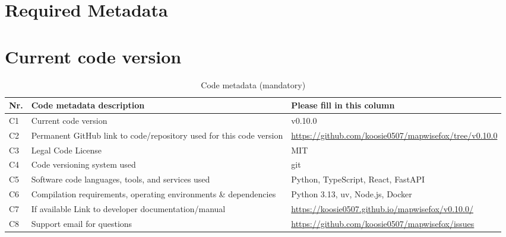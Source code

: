 \documentclass[preprint,12pt, a4paper]{elsarticle}
\begin{document}
\linenumbers


\section*{Required Metadata}

\section*{Current code version}


\begin{table}[!h]
  \begin{tabular}{|l|p{6.5cm}|p{6.5cm}|}
    \hline
    \textbf{Nr.} & \textbf{Code metadata description} & \textbf{Please fill
    in this column} \\
    \hline
    C1 & Current code version & v0.10.0 \\
    \hline
    C2 & Permanent GitHub link to code/repository used for this code version
    & \url{https://github.com/koosie0507/mapwisefox/tree/v0.10.0} \\
    \hline
    C3 & Legal Code License & MIT \\
    \hline
    C4 & Code versioning system used & git \\
    \hline
    C5 & Software code languages, tools, and services used & Python,
    TypeScript, React, FastAPI \\
    \hline
    C6 & Compilation requirements, operating environments \& dependencies &
    Python 3.13, uv, Node.js, Docker \\
    \hline
    C7 & If available Link to developer documentation/manual &
    \url{https://koosie0507.github.io/mapwisefox/v0.10.0/} \\
    \hline
    C8 & Support email for questions &
    \url{https://github.com/koosie0507/mapwisefox/issues} \\
    \hline
  \end{tabular}
  \caption{Code metadata (mandatory)}
  \label{tab:metadata}
\end{table}

\end{document}
